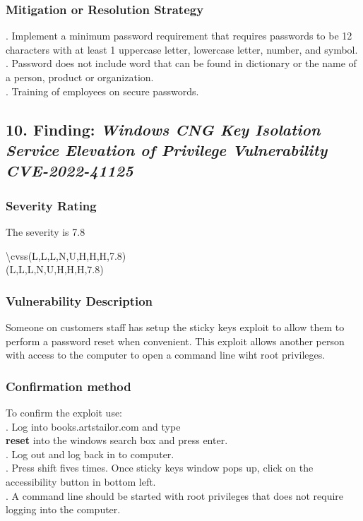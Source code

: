 \documentclass[notitlepage]{article}
\begin{document}
	\subsubsection{Mitigation or Resolution Strategy}
	\indent {}. Implement a minimum password requirement that requires passwords to be 12 characters with at least 1 uppercase letter, lowercase letter, number, and symbol.  \\
	. Password does not include word that can be found in dictionary or the name of a person, product or organization.  \\
	. Training of employees on secure passwords. \\
	
	\subsection{10. Finding: \emph{Windows CNG Key Isolation Service Elevation of Privilege Vulnerability CVE-2022-41125}}
	
	\subsubsection{Severity Rating}
	\indent The severity is 7.8 
	
	\textbackslash cvss(L,L,L,N,U,H,H,H,7.8)\\
	\cvss(L,L,L,N,U,H,H,H,7.8) \\
	
	\subsubsection{Vulnerability Description}
	\indent Someone on customers staff has setup the sticky keys exploit to allow them to perform a password reset when convenient. This exploit allows another person with access to the computer to open a command line wiht root privileges.  \\
	
	\subsubsection{Confirmation method}
	To confirm the exploit use: \\
	. Log into books.artstailor.com and type \textbf{\\reset} into the windows search box and press enter.  \\
	. Log out and log back in to computer. \\
	. Press shift fives times.  Once sticky keys window pops up, click on the accessibility button in bottom left. \\
	. A command line should be started with root privileges that does not require logging into the computer. 
	
\end{document}
